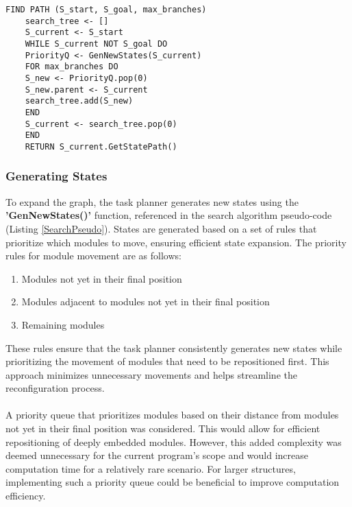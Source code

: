 \begin{lstlisting}[caption={Task Planner search algorithm pseudo-code},captionpos=b,label={SearchPseudo}]
	FIND PATH (S_start, S_goal, max_branches)
	search_tree <- []
	S_current <- S_start
	WHILE S_current NOT S_goal DO
	PriorityQ <- GenNewStates(S_current)
	FOR max_branches DO
	S_new <- PriorityQ.pop(0)
	S_new.parent <- S_current
	search_tree.add(S_new)
	END	
	S_current <- search_tree.pop(0)
	END
	RETURN S_current.GetStatePath()
\end{lstlisting}

\subsubsection{Generating States}
To expand the graph, the task planner generates new states using the \textbf{'GenNewStates()'} function, referenced in the search algorithm pseudo-code (Listing \ref{SearchPseudo}). States are generated based on a set of rules that prioritize which modules to move, ensuring efficient state expansion. The priority rules for module movement are as follows:
\begin{enumerate}[]
	\item Modules not yet in their final position
	\item Modules adjacent to modules not yet in their final position
	\item Remaining modules 
\end{enumerate}
These rules ensure that the task planner consistently generates new states while prioritizing the movement of modules that need to be repositioned first. This approach minimizes unnecessary movements and helps streamline the reconfiguration process.
\\\\
A priority queue that prioritizes modules based on their distance from modules not yet in their final position was considered. This would allow for efficient repositioning of deeply embedded modules. However, this added complexity was deemed unnecessary for the current program's scope and would increase computation time for a relatively rare scenario. For larger structures, implementing such a priority queue could be beneficial to improve computation efficiency.

